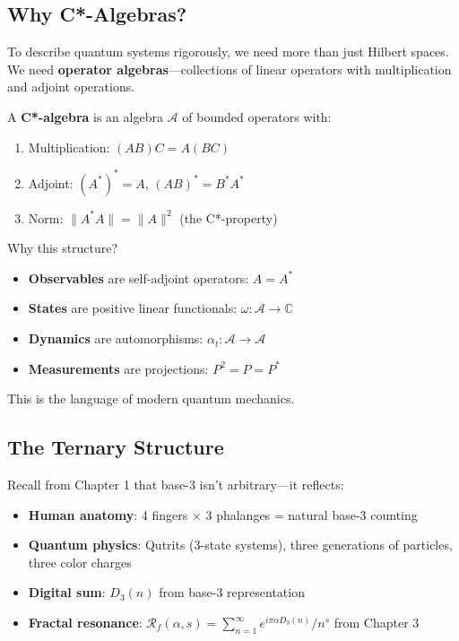 
\subsection{Why C*-Algebras?}

\begin{level2}
To describe quantum systems rigorously, we need more than just Hilbert spaces. We need \textbf{operator algebras}—collections of linear operators with multiplication and adjoint operations.

A \textbf{C*-algebra} is an algebra $\mathcal{A}$ of bounded operators with:
\begin{enumerate}
\item Multiplication: $(AB)C = A(BC)$
\item Adjoint: $(A^*)^* = A$, $(AB)^* = B^*A^*$
\item Norm: $\|A^*A\| = \|A\|^2$ (the C*-property)
\end{enumerate}

Why this structure?
\begin{itemize}
\item \textbf{Observables} are self-adjoint operators: $A = A^*$
\item \textbf{States} are positive linear functionals: $\omega: \mathcal{A} \to \mathbb{C}$
\item \textbf{Dynamics} are automorphisms: $\alpha_t: \mathcal{A} \to \mathcal{A}$
\item \textbf{Measurements} are projections: $P^2 = P = P^*$
\end{itemize}

This is the language of modern quantum mechanics\cite{connes_noncommutative_1994, takesaki_theory_2002}.
\end{level2}

\subsection{The Ternary Structure}

Recall from Chapter 1 that base-3 isn't arbitrary—it reflects:
\begin{itemize}
\item \textbf{Human anatomy}: 4 fingers × 3 phalanges = natural base-3 counting
\item \textbf{Quantum physics}: Qutrits (3-state systems), three generations of particles, three color charges
\item \textbf{Digital sum}: $D_3(n)$ from base-3 representation
\item \textbf{Fractal resonance}: $\mathcal{R}_f(\alpha, s) = \sum_{n=1}^\infty e^{i\pi\alpha D_3(n)}/n^s$ from Chapter 3
\end{itemize}

